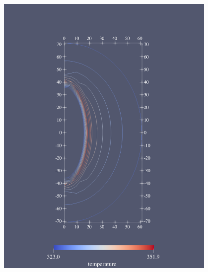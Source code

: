 \begin{figure}[ht!]
{\begin{minipage}{7cm}
            \includegraphics[width=0.95\textwidth]{img/chap5/温度/新能源储库等温线.pdf}
        \end{minipage}
    }
    \subfigure[传统能源储备库温度云图（t=3650d）]
    {
        \begin{minipage}{7cm}
            \centering

\end{minipage}}
\end{figure}
